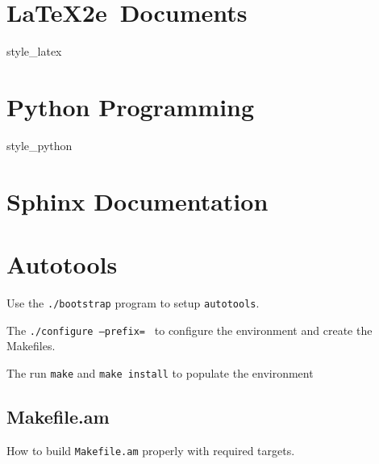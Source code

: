 \documentclass{book}
\begin{document}
\chapter{\LaTeX2e\ Documents}
{style_latex}

\chapter{Python Programming}
{style_python}

\chapter{Sphinx Documentation}

\chapter{Autotools}
Use the \texttt{./bootstrap} program to setup \texttt{autotools}.

The \texttt{./configure --prefix=~} to configure the environment
and create the Makefiles.

The run \texttt{make} and \texttt{make install} to populate the
environment

\section{Makefile.am}

How to build \texttt{Makefile.am} properly with required targets.

\printbibliography
\end{document}
